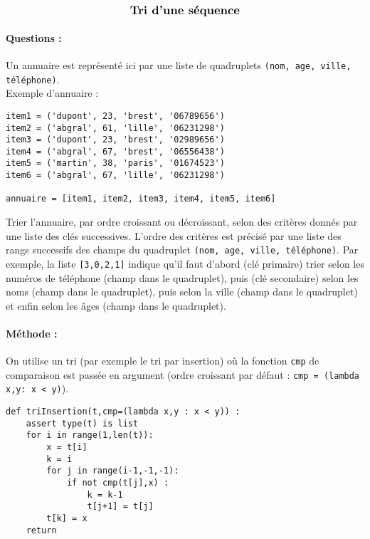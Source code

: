 \documentclass[11pt,a4paper]{article}
\begin{document}

$$\mbox{\textbf{\large Tri d'une séquence}}$$

\paragraph{Questions :}
Un annuaire est représenté ici par une liste de quadruplets 
\texttt{(nom, age, ville, téléphone)}.\\
Exemple d'annuaire :
\begin{minipage}[t]{7cm}
\begin{Verbatim}
item1 = ('dupont', 23, 'brest', '06789656')
item2 = ('abgral', 61, 'lille', '06231298')
item3 = ('dupont', 23, 'brest', '02989656')
item4 = ('abgral', 67, 'brest', '06556438')
item5 = ('martin', 38, 'paris', '01674523')
item6 = ('abgral', 67, 'lille', '06231298')

annuaire = [item1, item2, item3, item4, item5, item6]
\end{Verbatim}
\end{minipage}
\vspace*{3mm}

Trier l'annuaire, par ordre croissant ou décroissant, selon des critères donnés 
par une liste des clés successives. 
L'ordre des critères est précisé par une liste des rangs successifs des champs du quadruplet
\texttt{(nom, age, ville, téléphone)}. Par exemple, la liste \texttt{[3,0,2,1]} indique
qu'il faut d'abord (clé primaire) trier selon les numéros de téléphone (champ  dans le quadruplet), puis (clé secondaire) selon les noms (champ  dans le quadruplet), 
puis selon la ville (champ  dans le quadruplet) et enfin selon les âges 
(champ  dans le quadruplet).

\paragraph{Méthode :} 
On utilise un tri (par exemple le tri par insertion) où la fonction \texttt{cmp} de comparaison est passée en argument (ordre croissant par défaut : \texttt{cmp = (lambda x,y: x < y)}).

\begin{minipage}[t]{14cm}\footnotesize
\begin{lstlisting}
def triInsertion(t,cmp=(lambda x,y : x < y)) :
    assert type(t) is list
    for i in range(1,len(t)):
        x = t[i]
        k = i
        for j in range(i-1,-1,-1):
            if not cmp(t[j],x) :
                k = k-1
                t[j+1] = t[j]
        t[k] = x
    return
\end{lstlisting}
\end{minipage}
\end{document}
